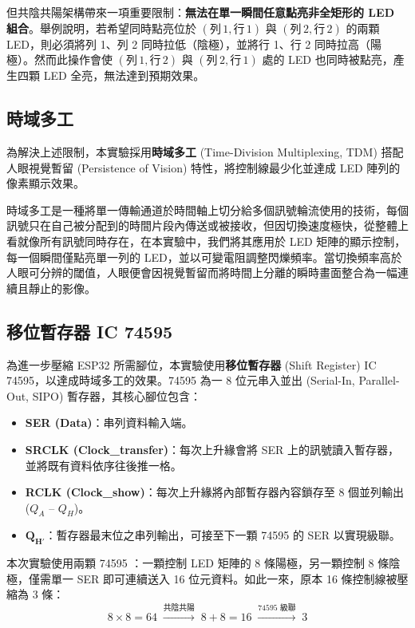 \documentclass[12pt]{article}
\begin{document}
但共陰共陽架構帶來一項重要限制：\textbf{無法在單一瞬間任意點亮非全矩形的 LED 組合}。舉例說明，若希望同時點亮位於 $(\text{列}\,1, \text{行}\,1)$ 與 $(\text{列}\,2, \text{行}\,2)$ 的兩顆 LED，則必須將列 1、列 2 同時拉低（陰極），並將行 1、行 2 同時拉高（陽極）。然而此操作會使 $(\text{列}\,1, \text{行}\,2)$ 與 $(\text{列}\,2, \text{行}\,1)$ 處的 LED 也同時被點亮，產生四顆 LED 全亮，無法達到預期效果。

\subsection{時域多工}

為解決上述限制，本實驗採用\textbf{時域多工} (Time-Division Multiplexing, TDM) 搭配人眼視覺暫留 (Persistence of Vision) 特性，將控制線最少化並達成 LED 陣列的像素顯示效果。

時域多工是一種將單一傳輸通道於時間軸上切分給多個訊號輪流使用的技術，每個訊號只在自己被分配到的時間片段內傳送或被接收，但因切換速度極快，從整體上看就像所有訊號同時存在，在本實驗中，我們將其應用於 LED 矩陣的顯示控制，每一個瞬間僅點亮單一列的 LED，並以可變電阻調整閃爍頻率。當切換頻率高於人眼可分辨的閾值，人眼便會因視覺暫留而將時間上分離的瞬時畫面整合為一幅連續且靜止的影像。

\subsection{移位暫存器 IC 74595}

為進一步壓縮 ESP32 所需腳位，本實驗使用\textbf{移位暫存器} (Shift Register) IC 74595，以達成時域多工的效果。74595 為一 8 位元串入並出 (Serial-In, Parallel-Out, SIPO) 暫存器，其核心腳位包含：

\begin{itemize}
    \item \textbf{SER (Data)}：串列資料輸入端。
    \item \textbf{SRCLK (Clock\_transfer)}：每次上升緣會將 SER 上的訊號讀入暫存器，並將既有資料依序往後推一格。
    \item \textbf{RCLK (Clock\_show)}：每次上升緣將內部暫存器內容鎖存至 8 個並列輸出 ($Q_A$ -- $Q_H$)。
    \item $\boldsymbol{Q_{H'}}$：暫存器最末位之串列輸出，可接至下一顆 74595 的 SER 以實現級聯。
\end{itemize}

本次實驗使用兩顆 74595 ：一顆控制 LED 矩陣的 8 條陽極，另一顆控制 8 條陰極，僅需單一 SER 即可連續送入 16 位元資料。如此一來，原本 16 條控制線被壓縮為 3 條：
\begin{equation}
    8 \times 8 = 64 \;\xrightarrow{\text{共陰共陽}}\; 8 + 8 = 16 \;\xrightarrow{\text{74595 級聯}}\; 3
\end{equation}
\end{document}
